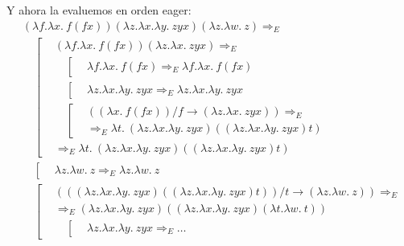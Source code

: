 \documentclass{article}
\begin{document}
Y ahora la evaluemos en orden eager:
\begin{equation*}
  \begin{aligned}
    &(\lambda f.\lambda x.\ f(fx))(\lambda z.\lambda x.\lambda y.\ zyx)(\lambda z.\lambda w.\ z) \Rightarrow_E \\
    &\quad\left[
      \begin{aligned}
        &(\lambda f.\lambda x.\ f(fx))(\lambda z.\lambda x.\ zyx) \Rightarrow_E \\ 
        &\quad\left[
          \begin{aligned}
            &\lambda f.\lambda x.\ f(fx) \Rightarrow_E \lambda f.\lambda x.\ f(fx)
          \end{aligned}
        \right. \\ 
        &\quad\left[
          \begin{aligned}
            &\lambda z.\lambda x.\lambda y.\ zyx \Rightarrow_E \lambda z.\lambda x.\lambda y.\ zyx
          \end{aligned}
        \right. \\ 
        &\quad\left[
          \begin{aligned}
            &((\lambda x.\ f(fx)) / f \to (\lambda z.\lambda x.\ zyx)) \Rightarrow_E \\ 
            &\Rightarrow_E \lambda t.\ (\lambda z.\lambda x.\lambda y.\ zyx)((\lambda z.\lambda x.\lambda y.\ zyx)t)
          \end{aligned}
        \right. \\ 
        &\Rightarrow_E \lambda t.\ (\lambda z.\lambda x.\lambda y.\ zyx)((\lambda z.\lambda x.\lambda y.\ zyx)t)
      \end{aligned}
    \right. \\ 
    &\quad\left[
      \begin{aligned}
        &\lambda z.\lambda w.\ z \Rightarrow_E \lambda z.\lambda w.\ z
      \end{aligned}
    \right. \\ 
    &\quad\left[
      \begin{aligned}
        &(((\lambda z.\lambda x.\lambda y.\ zyx)((\lambda z.\lambda x.\lambda y.\ zyx)t)) / t \to (\lambda z.\lambda w.\ z)) \Rightarrow_E \\ 
        &\Rightarrow_E (\lambda z.\lambda x.\lambda y.\ zyx)((\lambda z.\lambda x.\lambda y.\ zyx)(\lambda t.\lambda w.\ t)) \\ 
        &\quad\left[
          \begin{aligned}
            &\lambda z.\lambda x.\lambda y.\ zyx \Rightarrow_E \dots

\end{aligned}
\end{aligned}
\end{aligned}
\end{equation*}
\end{document}
